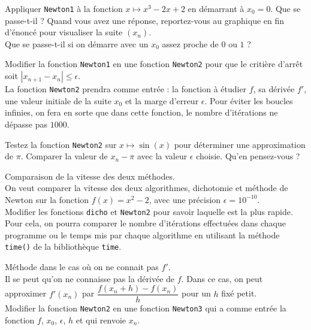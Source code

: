 \begin{exercice}
\label{exo newton diverge}
Appliquer \verb?Newton1? \` a la fonction $x\mapsto x^3-2x+2$ en d\' emarrant \` a $x_0=0$. Que se passe-t-il ? Quand vous avez une r\' eponse, reportez-vous au graphique en fin d'\' enonc\' e pour visualiser la suite $(x_n)$.\\
Que se passe-t-il si on d\' emarre avec un $x_0$ assez proche de $0$ ou $1$ ?
\end{exercice}



\begin{exercice}
Modifier la fonction \verb?Newton1? en une fonction \verb?Newton2? pour que le criti\` ere d'arr\^ et soit $|x_{n+1}-x_n|\leqslant \epsilon$. \\
La fonction \verb?Newton2? prendra comme entrée : la fonction \` a \' etudier $f$, sa d\' eriv\' ee $f'$, une valeur initiale de la suite $x_0$ et la marge d'erreur $\epsilon$. Pour éviter les boucles infinies, on fera en sorte que dans cette fonction, le nombre d'itérations ne dépasse pas $1 000$.
\end{exercice}



\begin{exercice}
Testez la fonction \verb?Newton2? sur $x\mapsto \sin(x)$ pour d\' eterminer une approximation de $\pi$. Comparer la valeur de $x_n-\pi$ avec la valeur $\epsilon$ choisie. Qu'en pensez-vous ?
\end{exercice}



\begin{exercice}Comparaison de la vitesse des deux m\' ethodes.\\
On veut comparer la vitesse des deux algorithmes, dichotomie et m\' ethode de Newton sur la fonction $f(x)=x^2-2$, avec une pr\' ecision $\epsilon=10^{-10}$.\\
Modifier les fonctions \verb?dicho? et \verb?Newton2? pour savoir laquelle est la plus rapide. Pour cela, on pourra comparer le nombre d'it\' erations effectu\' ees dans chaque programme ou le temps mis par chaque algorithme en utilisant la m\' ethode \verb?time()? de la biblioth\` eque \verb?time?.
\end{exercice}


\begin{exercice}Méthode dans le cas où on ne connait pas $f'$.\\
Il se peut qu'on ne connaisse pas la d\' eriv\' ee de $f$. Dans ce cas, on peut approximer $f'(x_n)$ par $\dfrac{f(x_n+h)-f(x_n)}{h}$ pour un $h$ fix\' e petit.\\
Modifier la fonction \verb?Newton2? en une fonction \verb?Newton3? qui a comme entr\' ee la fonction $f$, $x_0$, $\epsilon$, $h$ et qui renvoie $x_n$.
\end{exercice}




